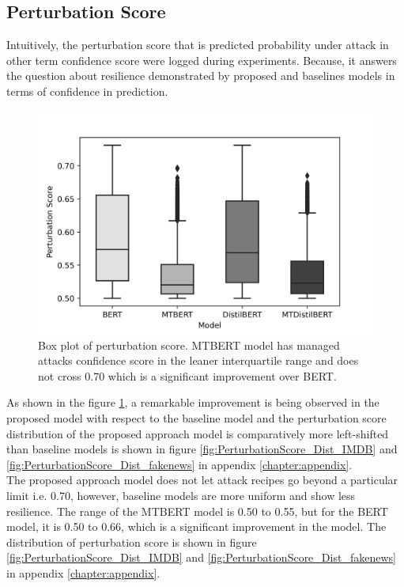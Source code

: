 \documentclass[%
	BCOR=8mm, %
	DIV=12,
	toc=bibliography, %
	toc=listof, %
	oneside, %
	egregdoesnotlikesansseriftitles, %
	]{scrbook}
\begin{document}
\subsection{Perturbation Score}
Intuitively, the perturbation score that is predicted probability under attack in other term confidence score were logged during experiments.  Because, it answers the question about  resilience demonstrated by proposed and baselines models in terms of confidence in prediction. 
\begin{figure}[H]
    \centering
    \includegraphics[width=.70\linewidth]{img/PertScoreDist}
    \caption[Box plot of perturbation score]{\small Box plot of perturbation score. MTBERT model has managed attacks confidence score in the leaner interquartile range and does not cross 0.70 which is a significant improvement over BERT.}
    \label{fig:pertscoredist}
\end{figure}
As shown in the figure \ref{fig:pertscoredist}, a remarkable improvement is being observed in the proposed model  with respect to the baseline model and the perturbation score distribution of the proposed approach model is comparatively more left-shifted than baseline models is shown in figure \ref{fig:PerturbationScore_Dist_IMDB} and \ref{fig:PerturbationScore_Dist_fakenews} in appendix \ref{chapter:appendix}. \\
The proposed approach model does not let attack recipes go beyond a particular limit i.e. 0.70, however, baseline models are more uniform and show less resilience.  The range of the MTBERT model is 0.50 to 0.55, but for the BERT model, it is 0.50 to 0.66, which is a significant improvement in the model.
The distribution of perturbation score is shown in figure \ref{fig:PerturbationScore_Dist_IMDB} and \ref{fig:PerturbationScore_Dist_fakenews} in appendix \ref{chapter:appendix}.
\end{document}
